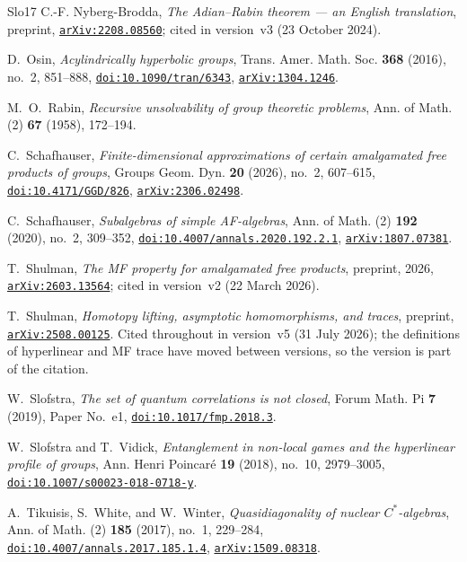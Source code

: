 \documentclass[11pt]{amsart}
\newcommand{\doi}[1]{\href{https://doi.org/#1}{\nolinkurl{doi:#1}}}
\newcommand{\arxiv}[1]{\href{https://arxiv.org/abs/#1}{\nolinkurl{arXiv:#1}}}
\theoremstyle{definition}
\theoremstyle{remark}
\theoremstyle{plain}
\begin{document}
\begin{thebibliography}{Slo17}
C.-F. Nyberg-Brodda,
\emph{The Adian--Rabin theorem --- an English translation},
preprint, \arxiv{2208.08560}; cited in version~v3 (23 October 2024).

D.~Osin,
\emph{Acylindrically hyperbolic groups},
Trans. Amer. Math. Soc. \textbf{368} (2016), no.~2, 851--888,
\doi{10.1090/tran/6343}, \arxiv{1304.1246}.

M.~O.~Rabin,
\emph{Recursive unsolvability of group theoretic problems},
Ann. of Math. (2) \textbf{67} (1958), 172--194.

C.~Schafhauser,
\emph{Finite-dimensional approximations of certain amalgamated free
products of groups},
Groups Geom. Dyn. \textbf{20} (2026), no.~2, 607--615,
\doi{10.4171/GGD/826}, \arxiv{2306.02498}.

C.~Schafhauser,
\emph{Subalgebras of simple AF-algebras},
Ann. of Math. (2) \textbf{192} (2020), no.~2, 309--352,
\doi{10.4007/annals.2020.192.2.1}, \arxiv{1807.07381}.

T.~Shulman,
\emph{The MF property for amalgamated free products},
preprint, 2026, \arxiv{2603.13564}; cited in version~v2 (22 March 2026).

T.~Shulman,
\emph{Homotopy lifting, asymptotic homomorphisms, and traces},
preprint, \arxiv{2508.00125}.
Cited throughout in version~v5 (31 July 2026); the definitions of
hyperlinear and MF trace have moved between versions, so the version is
part of the citation.

W.~Slofstra,
\emph{The set of quantum correlations is not closed},
Forum Math. Pi \textbf{7} (2019), Paper No.~e1,
\doi{10.1017/fmp.2018.3}.

W.~Slofstra and T.~Vidick,
\emph{Entanglement in non-local games and the hyperlinear profile of groups},
Ann. Henri Poincar\'e \textbf{19} (2018), no.~10, 2979--3005,
\doi{10.1007/s00023-018-0718-y}.

A.~Tikuisis, S.~White, and W.~Winter,
\emph{Quasidiagonality of nuclear $C^*$-algebras},
Ann. of Math. (2) \textbf{185} (2017), no.~1, 229--284,
\doi{10.4007/annals.2017.185.1.4}, \arxiv{1509.08318}.

\end{thebibliography}

\end{document}
